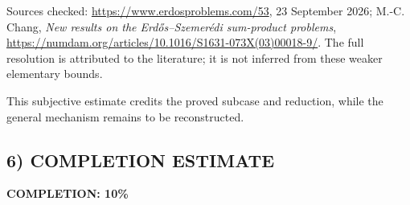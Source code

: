 Sources checked: \url{https://www.erdosproblems.com/53}, 23 September 2026; M.-C. Chang, \emph{New results on the Erd\H{o}s--Szemer\'edi sum-product problems}, \url{https://numdam.org/articles/10.1016/S1631-073X(03)00018-9/}. The full resolution is attributed to the literature; it is not inferred from these weaker elementary bounds.

This subjective estimate credits the proved subcase and reduction, while the general mechanism remains to be reconstructed.
\subsection*{6) COMPLETION ESTIMATE}
\textbf{COMPLETION: 10\%}

